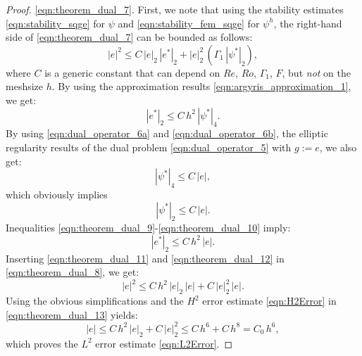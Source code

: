 \begin{proof}
  \eqref{eqn:theorem_dual_7}.  First, we note that using the stability estimates
  \eqref{eqn:stability_sqge} for $\psi$ and \eqref{eqn:stability_fem_sqge} for
  $\psi^h$, the right-hand side of \eqref{eqn:theorem_dual_7} can be bounded as
  follows:
  \begin{equation}
    |e|^2 \leq C \, | e |_2 \, |e^* |_2 + | e |_2^2 \,
      \left( \Gamma_1 \, | \psi^* |_2 \right) ,
    \label{eqn:theorem_dual_8}
  \end{equation}
  where $C$ is a generic constant that can depend on $Re$, $Ro$, $\Gamma_1$,
  $F$, but \emph{not} on the meshsize $h$.  By using the approximation results
  \eqref{eqn:argyris_approximation_1}, we get:
  \begin{equation}
    |e^* |_2 \leq C \, h^2 \, | \psi^* |_4 .
    \label{eqn:theorem_dual_9}
  \end{equation}
  By using \eqref{eqn:dual_operator_6a} and \eqref{eqn:dual_operator_6b}, the
  elliptic regularity results of the dual problem \eqref{eqn:dual_operator_5}
  with $g := e$, we also get:
  \begin{equation}
    | \psi^* |_4 \leq C \, | e | ,
    \label{eqn:theorem_dual_10}
  \end{equation}
  which obviously implies
  \begin{equation}
    | \psi^* |_2 \leq C \, | e | .
    \label{eqn:theorem_dual_11}
  \end{equation}
  Inequalities \eqref{eqn:theorem_dual_9}-\eqref{eqn:theorem_dual_10} imply:
  \begin{equation}
    |e^* |_2 \leq C \, h^2 \, | e | .
    \label{eqn:theorem_dual_12}
  \end{equation}
  Inserting \eqref{eqn:theorem_dual_11} and \eqref{eqn:theorem_dual_12}  in
  \eqref{eqn:theorem_dual_8}, we get:
  \begin{equation}
    |e|^2 \leq C \, h^2 \, | e |_2 \, | e | + C \, | e |_2^2 \, | e | .
    \label{eqn:theorem_dual_13}
  \end{equation}
  Using the obvious simplifications and the $H^2$ error estimate
  \eqref{eqn:H2Error} in \eqref{eqn:theorem_dual_13} yields:
  \begin{equation}
    |e| \leq C \, h^2 \, | e |_2 + C \, | e |_2^2 \leq C \, h^6 + C \, h^8
      = C_0 \, h^6 ,
    \label{eqn:theorem_dual_14}
  \end{equation}
  which proves the $L^2$ error estimate \eqref{eqn:L2Error}.


\end{proof}
